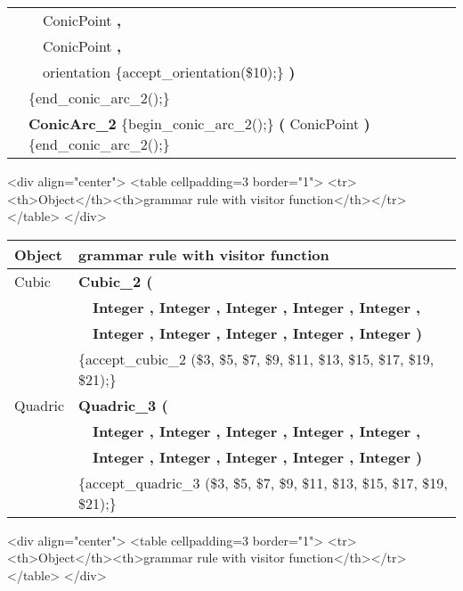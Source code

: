 \begin{ccTexOnly}
\begin{tabular}{*{2}{| l} |}
              & \ \ ConicPoint {\bf \Large ,}                    \\
              & \ \ ConicPoint {\bf \Large ,}                    \\
              & \ \ orientation \{accept\_orientation(\$10);\} {\bf \Large )}                  \\
              & \{end\_conic\_arc\_2();\}\\
              & {\bf ConicArc\_2} \{begin\_conic\_arc\_2();\} {\bf \Large (} ConicPoint {\bf \Large )} \{end\_conic\_arc\_2();\}\\ \hline
\end {tabular}
\end{ccTexOnly}

\begin{ccHtmlOnly}
<div align="center">
<table cellpadding=3 border="1">
<tr><th>Object</th><th>grammar rule with visitor function</th></tr>
</table>
</div>
\end{ccHtmlOnly}

\newpage

\begin{ccTexOnly}
\begin{tabular}{*{2}{| l} |} \hline
Object  & grammar rule with visitor function          \\ \hline \hline
Cubic   & {\bf Cubic\_2 (}        \\
        & \ \ {\bf Integer , Integer , Integer , Integer , Integer ,} \\
        & \ \ {\bf Integer , Integer , Integer , Integer , Integer )}  \\
        & \{accept\_cubic\_2 (\$3, \$5, \$7, \$9, \$11, \$13, \$15, \$17, \$19, \$21);\}\\ \hline
Quadric & {\bf Quadric\_3 (}      \\
        & \ \ {\bf Integer , Integer , Integer , Integer , Integer ,}  \\
        & \ \ {\bf Integer , Integer , Integer , Integer , Integer )}                  \\ 
        & \{accept\_quadric\_3 (\$3, \$5, \$7, \$9, \$11, \$13, \$15, \$17, \$19, \$21);\}\\ \hline
\end{tabular}
\end{ccTexOnly}

\begin{ccHtmlOnly}
<div align="center">
<table cellpadding=3 border="1">
<tr><th>Object</th><th>grammar rule with visitor function</th></tr>
</table>
</div>
\end{ccHtmlOnly}
